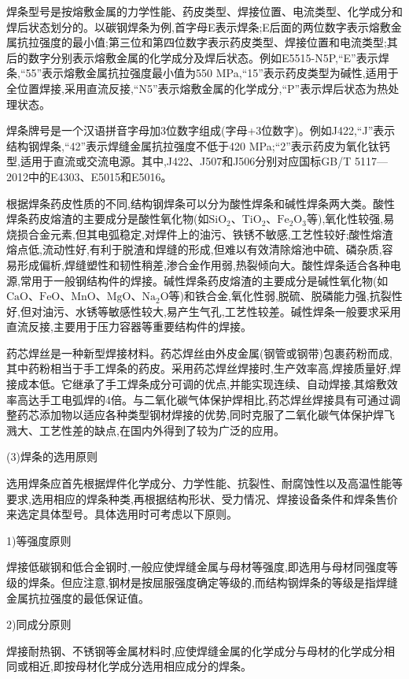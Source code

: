 \documentclass[UTF8]{ctexbook}
\newcommand{\◎}{\ensuremath{\bigcirc}}
\begin{document}
焊条型号是按熔敷金属的力学性能、药皮类型、焊接位置、电流类型、化学成分和焊后状态划分的。以碳钢焊条为例,首字母E表示焊条;E后面的两位数字表示熔敷金属抗拉强度的最小值;第三位和第四位数字表示药皮类型、焊接位置和电流类型;其后的数字分别表示熔敷金属的化学成分及焊后状态。例如E5515-N5P,“E”表示焊条,“55”表示熔敷金属抗拉强度最小值为550 MPa,“15”表示药皮类型为碱性,适用于全位置焊接,采用直流反接,“N5”表示熔敷金属的化学成分,“P”表示焊后状态为热处理状态。

焊条牌号是一个汉语拼音字母加3位数字组成(字母+3位数字)。例如J422,“J”表示结构钢焊条,“42”表示焊缝金属抗拉强度不低于420 MPa;“2”表示药皮为氧化钛钙型,适用于直流或交流电源。其中,J422、J507和J506分别对应国标GB/T 5117—2012中的E4303、E5015和E5016。

根据焊条药皮性质的不同,结构钢焊条可以分为酸性焊条和碱性焊条两大类。酸性焊条药皮熔渣的主要成分是酸性氧化物(如$\text{SiO}_2$、$\text{TiO}_2$、$\text{Fe}_2\text{O}_3$等),氧化性较强,易烧损合金元素,但其电弧稳定,对焊件上的油污、铁锈不敏感,工艺性较好;酸性熔渣熔点低,流动性好,有利于脱渣和焊缝的形成,但难以有效清除熔池中硫、磷杂质,容易形成偏析,焊缝塑性和韧性稍差,渗合金作用弱,热裂倾向大。酸性焊条适合各种电源,常用于一般钢结构件的焊接。碱性焊条药皮熔渣的主要成分是碱性氧化物(如$\text{CaO}$、$\text{FeO}$、$\text{MnO}$、$\text{MgO}$、$\text{Na}_2\text{O}$等)和铁合金,氧化性弱,脱硫、脱磷能力强,抗裂性好,但对油污、水锈等敏感性较大,易产生气孔,工艺性较差。碱性焊条一般要求采用直流反接,主要用于压力容器等重要结构件的焊接。

药芯焊丝是一种新型焊接材料。药芯焊丝由外皮金属(钢管或钢带)包裹药粉而成,其中药粉相当于手工焊条的药皮。采用药芯焊丝焊接时,生产效率高,焊接质量好,焊接成本低。它继承了手工焊条成分可调的优点,并能实现连续、自动焊接,其熔敷效率高达手工电弧焊的4倍。与二氧化碳气体保护焊相比,药芯焊丝焊接具有可通过调整药芯添加物以适应各种类型钢材焊接的优势,同时克服了二氧化碳气体保护焊飞溅大、工艺性差的缺点,在国内外得到了较为广泛的应用。

(3)焊条的选用原则

选用焊条应首先根据焊件化学成分、力学性能、抗裂性、耐腐蚀性以及高温性能等要求,选用相应的焊条种类,再根据结构形状、受力情况、焊接设备条件和焊条售价来选定具体型号。具体选用时可考虑以下原则。

1)等强度原则

焊接低碳钢和低合金钢时,一般应使焊缝金属与母材等强度,即选用与母材同强度等级的焊条。但应注意,钢材是按屈服强度确定等级的,而结构钢焊条的等级是指焊缝金属抗拉强度的最低保证值。

2)同成分原则

焊接耐热钢、不锈钢等金属材料时,应使焊缝金属的化学成分与母材的化学成分相同或相近,即按母材化学成分选用相应成分的焊条。
\end{document}
